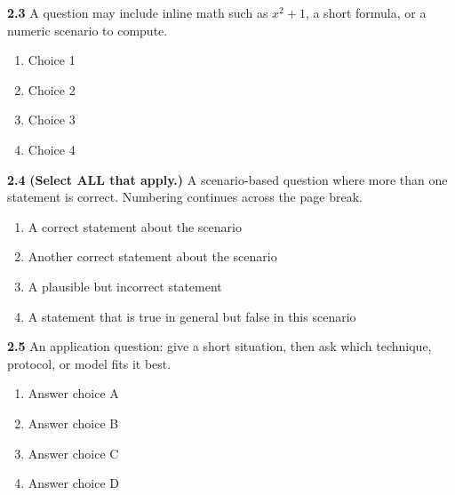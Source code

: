 \vspace{5mm}

\textbf{2.3}  A question may include inline math such as $x^2 + 1$,
a short formula, or a numeric scenario to compute.

\begin{enumerate}[label=\alph*)]
\item Choice 1
\item Choice 2
\item Choice 3
\item Choice 4
\end{enumerate}

\vspace{5mm}


\newpage
\textbf{2.4}  \textbf{(Select ALL that apply.)}
A scenario-based question where more than one statement is correct.
Numbering continues across the page break.

\begin{enumerate}[label=\alph*)]
\item A correct statement about the scenario
\item Another correct statement about the scenario
\item A plausible but incorrect statement
\item A statement that is true in general but false in this scenario
\end{enumerate}

\vspace{5mm}

\textbf{2.5}  An application question: give a short situation,
then ask which technique, protocol, or model fits it best.

\begin{enumerate}[label=\alph*)]
\item Answer choice A
\item Answer choice B
\item Answer choice C
\item Answer choice D
\end{enumerate}
